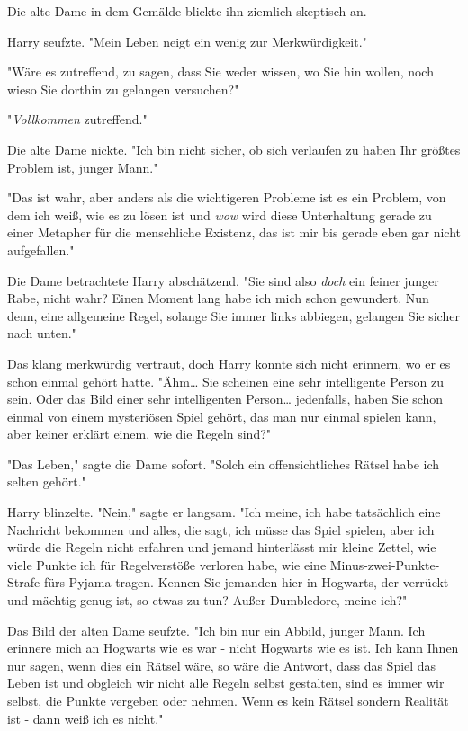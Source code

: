 {Die alte Dame in dem Gemälde blickte ihn ziemlich skeptisch an.

Harry seufzte. "Mein Leben neigt ein wenig zur Merkwürdigkeit."

"Wäre es zutreffend, zu sagen, dass Sie weder wissen, wo Sie hin wollen, noch wieso Sie dorthin zu gelangen versuchen?"

"\emph{Vollkommen} zutreffend."

Die alte Dame nickte. "Ich bin nicht sicher, ob sich verlaufen zu haben Ihr größtes Problem ist, junger Mann."

"Das ist wahr, aber anders als die wichtigeren Probleme ist es ein Problem, von dem ich weiß, wie es zu lösen ist und \emph{wow} wird diese Unterhaltung gerade zu einer Metapher für die menschliche Existenz, das ist mir bis gerade eben gar nicht aufgefallen."

Die Dame betrachtete Harry abschätzend. "Sie sind also \emph{doch} ein feiner junger Rabe, nicht wahr? Einen Moment lang habe ich mich schon gewundert. Nun denn, eine allgemeine Regel, solange Sie immer links abbiegen, gelangen Sie sicher nach unten."

Das klang merkwürdig vertraut, doch Harry konnte sich nicht erinnern, wo er es schon einmal gehört hatte. "Ähm… Sie scheinen eine sehr intelligente Person zu sein. Oder das Bild einer sehr intelligenten Person… jedenfalls, haben Sie schon einmal von einem mysteriösen Spiel gehört, das man nur einmal spielen kann, aber keiner erklärt einem, wie die Regeln sind?"

"Das Leben," sagte die Dame sofort. "Solch ein offensichtliches Rätsel habe ich selten gehört."

Harry blinzelte. "Nein," sagte er langsam. "Ich meine, ich habe tatsächlich eine Nachricht bekommen und alles, die sagt, ich müsse das Spiel spielen, aber ich würde die Regeln nicht erfahren und jemand hinterlässt mir kleine Zettel, wie viele Punkte ich für Regelverstöße verloren habe, wie eine Minus-zwei-Punkte-Strafe fürs Pyjama tragen. Kennen Sie jemanden hier in Hogwarts, der verrückt und mächtig genug ist, so etwas zu tun? Außer Dumbledore, meine ich?"

Das Bild der alten Dame seufzte. "Ich bin nur ein Abbild, junger Mann. Ich erinnere mich an Hogwarts wie es war - nicht Hogwarts wie es ist. Ich kann Ihnen nur sagen, wenn dies ein Rätsel wäre, so wäre die Antwort, dass das Spiel das Leben ist und obgleich wir nicht alle Regeln selbst gestalten, sind es immer wir selbst, die Punkte vergeben oder nehmen. Wenn es kein Rätsel sondern Realität ist - dann weiß ich es nicht."

}
